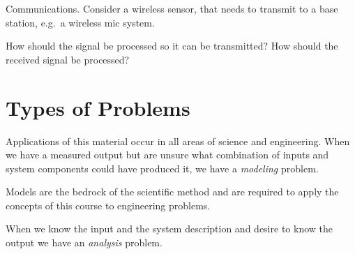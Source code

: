 \begin{example} Communications. Consider a wireless sensor, that needs to transmit to a base station, e.g.\ a wireless mic system. 
  \begin{center}
  \end{center}

  How should the signal be processed so it can be transmitted? How should the received signal be processed?
\end{example}

\section{Types of Problems}
Applications of this material occur in all areas of science and engineering. When we have a measured output but are unsure what combination of inputs and system components could have produced it, we have a \textit{modeling} problem.

\begin{center}
\end{center}

Models are the bedrock of the scientific method and are required to apply the concepts of this course to engineering problems. 

When we know the input and the system description and desire to know the output we have an \textit{analysis} problem. 

